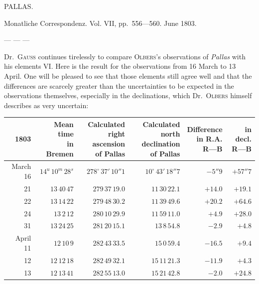 \begin{center}
PALLAS.
\end{center}


Monatliche Correspondenz. Vol. VII, pp.\ 556—560. June 1803.


— — —

Dr.\ \textsc{Gauss} continues tirelessly to compare \textsc{Olbers}’s observations of \emph{Pallas} with his elements VI. Here is the result for the observations from 16 March to 13 April. One will be pleased to see that those elements still agree well and that the differences are scarcely greater than the uncertainties to be expected in the observations themselves, especially in the declinations, which Dr.\ \textsc{Olbers} himself describes as very uncertain:

\begin{center}
\begingroup\fontsize{8}{10}\selectfont\setlength{\tabcolsep}{3pt}\renewcommand{\arraystretch}{1.12}
\begin{tabular}{r|r|r|r|r|r}
1803 & \shortstack{Mean time\\in\\Bremen} & \shortstack{Calculated\\right ascension\\of Pallas} & \shortstack{Calculated\\north declination\\of Pallas} & \shortstack{Difference\\in R.A.\\R—B} & \shortstack{in decl.\\R—B} \\ \hline
March 16 & $14^u\,10^m\,28^s$ & $278^\circ\,37'\,10''1$ & $10^\circ\,43'\,18''7$ & $-5''9$ & $+57''7$ \\
21 & $13\,40\,47$ & $279\,37\,19.0$ & $11\,30\,22.1$ & $+14.0$ & $+19.1$ \\
22 & $13\,14\,22$ & $279\,48\,30.2$ & $11\,39\,49.6$ & $+20.2$ & $+64.6$ \\
24 & $13\,2\,12$ & $280\,10\,29.9$ & $11\,59\,11.0$ & $+4.9$ & $+28.0$ \\
31 & $13\,24\,25$ & $281\,20\,15.1$ & $13\,8\,54.8$ & $-2.9$ & $+4.8$ \\
April 11 & $12\,10\,9$ & $282\,43\,33.5$ & $15\,0\,59.4$ & $-16.5$ & $+9.4$ \\
12 & $12\,12\,18$ & $282\,49\,32.1$ & $15\,11\,21.3$ & $-11.9$ & $+4.3$ \\
13 & $12\,13\,41$ & $282\,55\,13.0$ & $15\,21\,42.8$ & $-2.0$ & $+24.8$ \\
\end{tabular}\endgroup
\end{center}

\begin{flushright}
\end{flushright}
